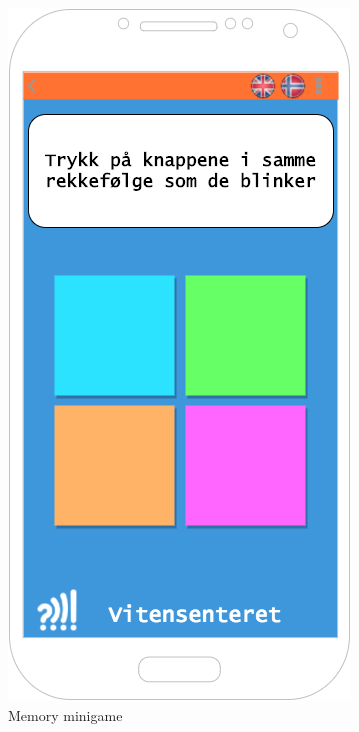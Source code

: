 \begin{figure}[H]
\begin{minipage}[b]{0.33\textwidth}
    \includegraphics[width=\textwidth]{images/sketches/MemoryGame.png}
    \caption{Memory minigame}
    \label{fig:memoryMinigame}
  \end{minipage}
\end{figure}

